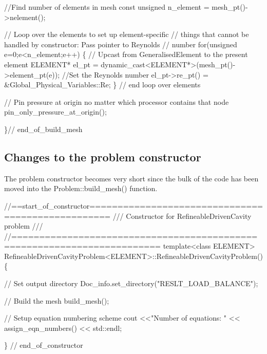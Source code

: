 \begin{DoxyCodeInclude}
 \textcolor{comment}{//Find number of elements in mesh}
 \textcolor{keyword}{const} \textcolor{keywordtype}{unsigned} n\_element = mesh\_pt()->nelement();

 \textcolor{comment}{// Loop over the elements to set up element-specific }
 \textcolor{comment}{// things that cannot be handled by constructor: Pass pointer to Reynolds}
 \textcolor{comment}{// number}
 \textcolor{keywordflow}{for}(\textcolor{keywordtype}{unsigned} e=0;e<n\_element;e++)
  \{
   \textcolor{comment}{// Upcast from GeneralisedElement to the present element}
   ELEMENT* el\_pt = \textcolor{keyword}{dynamic\_cast<}ELEMENT*\textcolor{keyword}{>}(mesh\_pt()->element\_pt(e));
   \textcolor{comment}{//Set the Reynolds number}
   el\_pt->re\_pt() = &Global\_Physical\_Variables::Re;
  \} \textcolor{comment}{// end loop over elements}
 
 \textcolor{comment}{// Pin pressure at origin no matter which processor contains that node}
 pin\_only\_pressure\_at\_origin();

\}\textcolor{comment}{// end\_of\_build\_mesh}

\end{DoxyCodeInclude}
\hypertarget{index_problem_constructor}{}\subsection{Changes to the problem constructor}\label{index_problem_constructor}
The problem constructor becomes very short since the bulk of the code has been moved into the {\ttfamily Problem\+::build\+\_\+mesh()} function.

 
\begin{DoxyCodeInclude}
\textcolor{comment}{//==start\_of\_constructor==================================================}
\textcolor{comment}{/// Constructor for RefineableDrivenCavity problem }
\textcolor{comment}{}\textcolor{comment}{///}
\textcolor{comment}{}\textcolor{comment}{//========================================================================}
\textcolor{keyword}{template}<\textcolor{keyword}{class} ELEMENT>
RefineableDrivenCavityProblem<ELEMENT>::RefineableDrivenCavityProblem()
\{ 

 \textcolor{comment}{// Set output directory}
 Doc\_info.set\_directory(\textcolor{stringliteral}{"RESLT\_LOAD\_BALANCE"});

 \textcolor{comment}{// Build the mesh}
 build\_mesh();

 \textcolor{comment}{// Setup equation numbering scheme}
 cout <<\textcolor{stringliteral}{"Number of equations: "} << assign\_eqn\_numbers() << std::endl; 
 
\} \textcolor{comment}{// end\_of\_constructor}

\end{DoxyCodeInclude}




